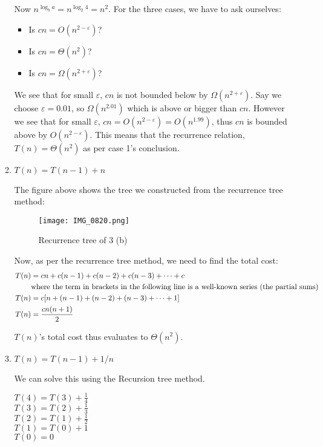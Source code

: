 \documentclass[11pt]{article}
\begin{document}
\begin{enumerate}
\begin{enumerate}
Now $n^{\log_b a} = n^{\log_2 4} =n^2$. 
For the three cases, we have to ask ourselves:
\begin{itemize}
    \item Is $cn = O(n^{2-\varepsilon})$?
    \item Is $cn = \Theta(n^2)$?
    \item Is $cn = \Omega(n^{2+\varepsilon})$?
\end{itemize}

We see that for small $\varepsilon$, $cn$ is not bounded below by $\Omega(n^{2+\varepsilon})$. Say we choose $\varepsilon = 0.01$, so $\Omega(n^{2.01})$ which is above or bigger than $cn$. However we see that for small $\varepsilon$, $cn = O(n^{2-\varepsilon}) = O(n^1.99)$, thus $cn$ is bounded above by $O(n^{2-\varepsilon})$.
This means that the recurrence relation, $T(n) = \Theta(n^2)$ as per case 1's conclusion.

\item $T(n) = T(n-1) + n$

The figure above shows the tree we constructed from the recurrence tree method:

\begin{figure}
  \centering
  \texttt{[image: IMG\_0820.png]}
  \caption{Recurrence tree of 3 (b)}
\end{figure}

Now, as per the recurrence tree method, we need to find the total cost:
\begin{align*}
    T(n) &= cn + c(n-1) + c(n-2) + c(n-3) + \cdots + c \notag \\
    &\text{where the term in brackets in the following line is a well-known series (the partial sums)} \notag \\
    T(n) &= c[n + (n-1) + (n-2) + (n-3) + \cdots + 1] \\
    T(n) &= \frac{cn(n+1)}{2}
\end{align*}

$T(n)$'s total cost thus evaluates to $\Theta(n^2)$.

\item $T(n) = T(n-1) + 1/n$

We can solve this using the Recursion tree method.

$T(4) = T(3) + \frac{1}{4}$ \\
$T(3) = T(2) + \frac{1}{3}$ \\
$T(2) = T(1) + \frac{1}{2}$ \\
$T(1) = T(0) + 1$ \\
$T(0) = 0$


\end{enumerate}
\end{enumerate}
\end{document}
